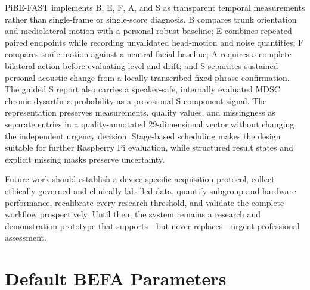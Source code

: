 \documentclass[11pt,a4paper]{article}
\begin{document}
PiBE-FAST implements B, E, F, A, and S as transparent temporal measurements rather than single-frame or single-score diagnosis. B compares trunk orientation and mediolateral motion with a personal robust baseline; E combines repeated paired endpoints while recording unvalidated head-motion and noise quantities; F compares smile motion against a neutral facial baseline; A requires a complete bilateral action before evaluating level and drift; and S separates sustained personal acoustic change from a locally transcribed fixed-phrase confirmation. The guided S report also carries a speaker-safe, internally evaluated MDSC chronic-dysarthria probability as a provisional S-component signal. The representation preserves measurements, quality values, and missingness as separate entries in a quality-annotated 29-dimensional vector without changing the independent urgency decision. Stage-based scheduling makes the design suitable for further Raspberry Pi evaluation, while structured result states and explicit missing masks preserve uncertainty.

Future work should establish a device-specific acquisition protocol, collect ethically governed and clinically labelled data, quantify subgroup and hardware performance, recalibrate every research threshold, and validate the complete workflow prospectively. Until then, the system remains a research and demonstration prototype that supports---but never replaces---urgent professional assessment.




\appendix
\section{Default BEFA Parameters}
\end{document}
